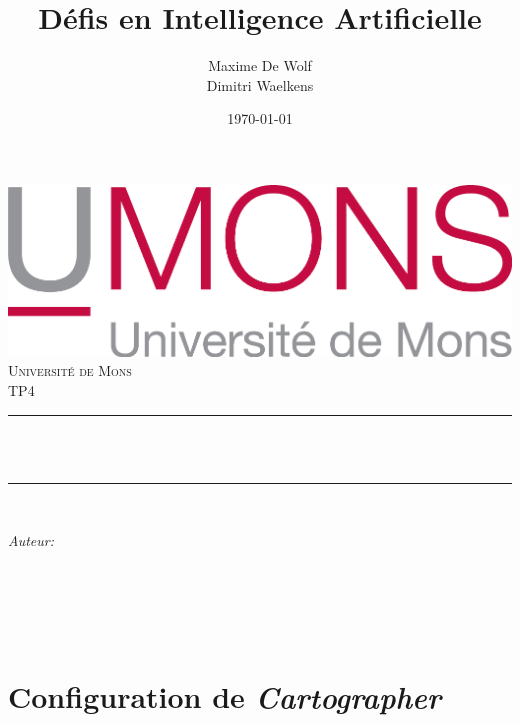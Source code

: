 \documentclass[10pt,a4paper]{article}
\title{Défis en Intelligence Artificielle}                             %
\author{Maxime De Wolf\\
		Dimitri Waelkens}                               %
\date{\today}                                           %
\makeatletter
\let\thetitle\@title
\let\theauthor\@author
\let\thedate\@date
\makeatother
\begin{document}
   	
   	
   	\begin{titlepage}
   		\centering
   		\vspace*{0.5 cm}
   		\includegraphics[scale = 0.75]{UMONS}\\[1.0 cm]   %
   		\textsc{\LARGE Université de Mons}\\[2.0 cm]   %
   		\textsc{\large TP4}\\[0.5 cm]               %
   		\rule{\linewidth}{0.2 mm} \\[0.4 cm]
   		{ \huge \bfseries \thetitle}\\
   		\rule{\linewidth}{0.2 mm} \\[1.5 cm]
   		
   		\begin{minipage}{0.4\textwidth}
   			\begin{flushleft} \large
   				\emph{Auteur:}\\
   				\theauthor
   			\end{flushleft}
   		\end{minipage}~
   		\begin{minipage}{0.4\textwidth}
   			\begin{flushright} \large
   				\emph{}                                  %
   			\end{flushright}
   		\end{minipage}\\[2 cm]
   		
   		{\large \thedate}\\[2 cm]
   		
   		\vfill
   		
   	\end{titlepage}
   	
   	
   	\section{Configuration de \textit{Cartographer}}
   	
\end{document}
